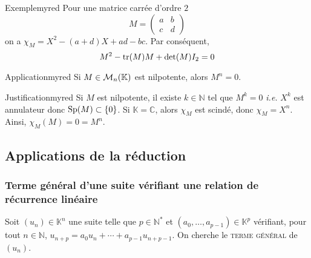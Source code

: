     \begin{omed}{Exemple}{myred}
        Pour une matrice carrée d’ordre $2$ 
        \[ M = \begin{pmatrix}
            a & b \\
            c & d
        \end{pmatrix} \]  
        on a $\chi_M = X^2 - (a+d)X + ad - bc$. Par conséquent, 
        \[ M^2 - \operatorname{tr}(M) M + \operatorname{det}(M) I_2 = 0 \]
    \end{omed}

    \begin{omed}{Application}{myred}
        Si $M \in \mathcal{M}_{n}(\mathbb{K})$ est nilpotente, alors $M^n = 0$.
    \end{omed}

    \begin{demo}{Justification}{myred}
        Si $M$ est nilpotente, il existe $k \in \mathbb{N}$ tel que $M^k = 0$ \textit{i.e.} $X^k$ est annulateur donc $\operatorname{Sp}(M) \subset \left\{0\right\}$. Si $\mathbb{K} = \mathbb{C}$, alors $\chi_M$ est scindé, donc $\chi_M = X^n$. Ainsi, $\chi_M(M) = 0 = M^n$.
    \end{demo}

\subsection{Applications de la réduction}

    \subsubsection{Terme général d’une suite vérifiant une relation de récurrence linéaire}

    Soit $(u_n) \in \mathbb{K}^n$ une suite telle que $p \in \mathbb{N}^*$ et $(a_0, \ldots, a_{p-1}) \in \mathbb{K}^p$ vérifiant, pour tout $n \in \mathbb{N}$, $u_{n+p} = a_0 u_n + \cdots + a_{p-1} u_{n + p-1}$. On cherche le \textsc{terme général} de $(u_n)$. 
    
